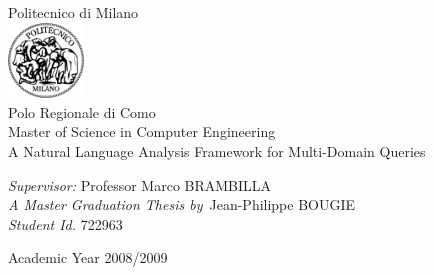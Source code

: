 \begin{titlepage}
  \setlength{\parindent}{0cm}
  \selectfont
  \begin{flushleft}
    \LARGE{Politecnico di Milano}\\[0.5cm]
    \includegraphics[width=0.15\textwidth]{images/logopolimi}\\[0.5cm]
    \large{Polo Regionale di Como}\\[2cm]
  
    \LARGE{Master of Science in Computer Engineering}\\[2cm]
  
    \Huge{A Natural Language Analysis Framework for Multi-Domain Queries}\\[2cm]
  
    \begin{large}
      \emph{Supervisor:} Professor Marco BRAMBILLA \\
      \emph{A Master Graduation Thesis by}\ Jean-Philippe BOUGIE \\
      \emph{Student Id.} 722963\\[2.5cm]
    \end{large}
  \end{flushleft}
  
  \begin{flushright}
    Academic Year 2008/2009
  \end{flushright}
\end{titlepage}